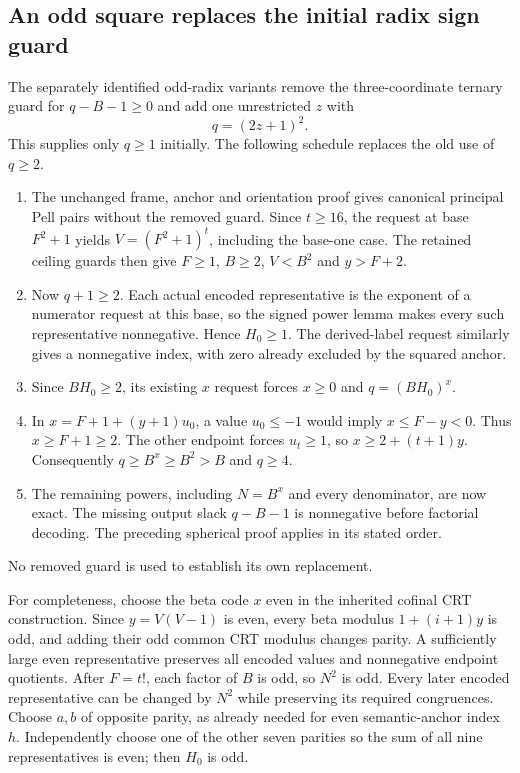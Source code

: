 \subsection{An odd square replaces the initial radix sign guard}
The separately identified odd-radix variants remove the three-coordinate
ternary guard for $q-B-1\ge0$ and add one unrestricted $z$ with
\begin{equation}\label{eq:oddradix}
 q=(2z+1)^2.
\end{equation}
This supplies only $q\ge1$ initially. The following schedule replaces the
old use of $q\ge2$.
\begin{enumerate}
\item The unchanged frame, anchor and orientation proof gives canonical
principal Pell pairs without the removed guard. Since $t\ge16$, the
request at base $F^2+1$ yields $V=(F^2+1)^t$, including the base-one case.
The retained ceiling guards then give $F\ge1$, $B\ge2$, $V<B^2$ and
$y>F+2$.
\item Now $q+1\ge2$. Each actual encoded representative is the exponent
of a numerator request at this base, so the signed power lemma makes every
such representative nonnegative. Hence $H_0\ge1$. The derived-label
request similarly gives a nonnegative index, with zero already excluded
by the squared anchor.
\item Since $BH_0\ge2$, its existing $x$ request forces $x\ge0$ and
$q=(BH_0)^x$.
\item In $x=F+1+(y+1)u_0$, a value $u_0\le-1$ would imply
$x\le F-y<0$. Thus $x\ge F+1\ge2$. The other endpoint forces
$u_t\ge1$, so $x\ge2+(t+1)y$. Consequently
$q\ge B^x\ge B^2>B$ and $q\ge4$.
\item The remaining powers, including $N=B^x$ and every denominator,
are now exact. The missing output slack $q-B-1$ is nonnegative before
factorial decoding. The preceding spherical proof applies in its stated
order.
\end{enumerate}
No removed guard is used to establish its own replacement.

For completeness, choose the beta code $x$ even in the inherited cofinal
CRT construction. Since $y=V(V-1)$ is even, every beta modulus
$1+(i+1)y$ is odd, and adding their odd common CRT modulus changes parity.
A sufficiently large even representative preserves all encoded values and
nonnegative endpoint quotients. After $F=t!$, each factor of $B$ is odd,
so $N^2$ is odd. Every later encoded representative can be changed by
$N^2$ while preserving its required congruences. Choose $a,b$ of opposite
parity, as already needed for even semantic-anchor index $h$. Independently
choose one of the other seven parities so the sum of all nine
representatives is even; then $H_0$ is odd.

